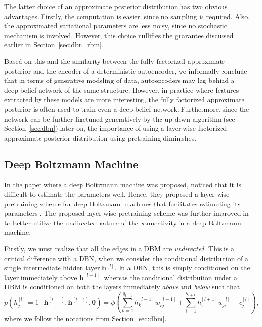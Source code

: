 \documentclass[dissertation,nocontribution,draft*]{aaltoseries}
\newcommand{\qlay}[1]{\left[#1\right]}
\newcommand{\vect}[1]{\mathbf{#1}}
\newcommand{\vects}[1]{\boldsymbol{#1}}
\newcommand{\vh}[0]{\vect{h}}
\newcommand{\TT}[0]{{\vects{\theta}}}
\begin{document}
The latter choice of an approximate posterior distribution
has two obvious advantages. Firstly, the computation is
easier, since no sampling is required. Also, the
approximated variational parameters are less noisy, since no
stochastic mechanism is involved. However, this choice
nullifies the guarantee discussed earlier in
Section~\ref{sec:dbn_rbm}.

Based on this and the similarity between the fully
factorized approximate posterior and the encoder of a
deterministic autoencoder, we informally conclude that in
terms of generative modeling of data, autoencoders may lag
behind a deep belief network of the same structure. However,
in practice where features extracted by these models are
more interesting, the fully factorized approximate posterior
is often used to train even a deep belief network.
Furthermore, since the network can be further finetuned
generatively by the up-down algorithm (see
Section~\ref{sec:dbn}) later on, the importance of using a
layer-wise factorized approximate posterior distribution
using pretraining diminishes.



\subsection{Deep Boltzmann Machine}
\label{sec:dbm_pre}

In the paper where a deep
Boltzmann machine was proposed, \citet{Salakhutdinov2009a} noticed that it is difficult
to estimate the parameters well. Hence, they proposed a
layer-wise pretraining scheme for deep Boltzmann machines
that facilitates estimating its parameters
\citep{Salakhutdinov2012nc}. The proposed layer-wise
pretraining scheme was further improved in
\citep{Salakhutdinov2012} to better utilize the undirected
nature of the connectivity in a deep Boltzmann machine.

Firstly, we must realize that all the edges in a DBM are
\textit{undirected}. This is a critical difference with a
DBN, when we consider the conditional distribution of a
single intermediate hidden layer $\vh^{\qlay{l}}$. In a DBN, this
is simply conditioned on the layer immediately above
$\vh^{\qlay{l+1}}$, whereas the conditional distribution under a
DBM is conditioned on both the layers immediately
\textit{above} and \textit{below} such that
\[
p(h^{\qlay{l}}_j = 1 \mid \vh^{\qlay{l-1}}, \vh^{\qlay{l+1}}, \TT) = \phi\left(
\sum_{k=1}^{q_{l-1}} h^{\qlay{l-1}}_k w_{kj}^{\qlay{l-1}} +
\sum_{i=1}^{q_{l+1}} h^{\qlay{l+1}}_i w_{ji}^{\qlay{l}} +
c_j^{\qlay{l}}
\right),
\]
where we follow the notations from Section~\ref{sec:dbm}.
\end{document}
